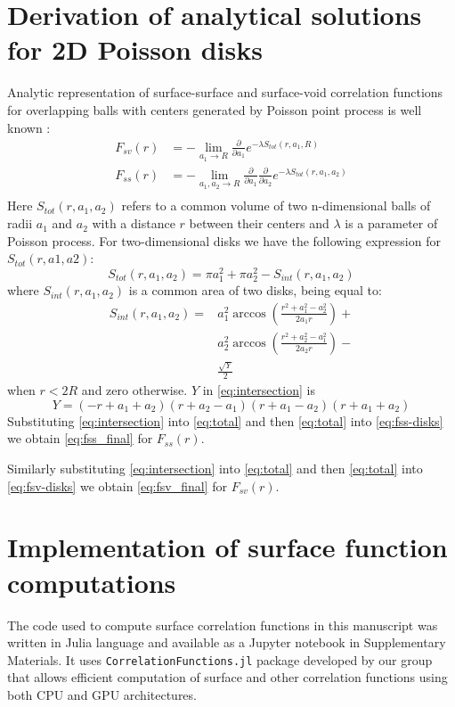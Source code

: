 \documentclass[reprint,amsmath,amssymb,aps,pre]{revtex4-1}
\newcommand{\code}[1]{\colorbox{light-gray}{\texttt{#1}}}
\begin{document}
\section{Derivation of analytical solutions for 2D Poisson disks}
\label{ap:overlapping-disks}
Analytic representation of surface-surface and surface-void correlation
functions for overlapping balls with centers generated by Poisson point process
is well known \cite{Torq_book}:
\begin{align}
  F_{sv}(r) &= -\lim_{a_1 \rightarrow R} \frac{\partial}{\partial a_1}
  e^{-\lambda S_{tot}(r, a_1, R)} \label{eq:fsv-disks} \\
  F_{ss}(r) &= -\lim_{a_1, a_2 \rightarrow R} \frac{\partial}{\partial a_1}
  \frac{\partial}{\partial a_2} e^{-\lambda S_{tot}(r, a_1,
    a_2)} \label{eq:fss-disks} \\
\end{align}
Here $S_{tot}(r, a_1, a_2)$ refers to a common volume of two n-dimensional balls
of radii $a_1$ and $a_2$ with a distance $r$ between their centers and $\lambda$
is a parameter of Poisson process. For two-dimensional disks we have the
following expression for $S_{tot}(r, a1, a2)$:
\begin{equation}
  S_{tot}(r, a_1, a_2) = \pi a_1^2 + \pi a_2^2 - S_{int}(r, a_1, a_2) \label{eq:total}
\end{equation}
where $S_{int}(r, a_1, a_2)$ is a common area of two disks, being equal to:
\cite{Math_stack_link}
\begin{align}
  S_{int}(r, a_1, a_2) =&  a_1^2 \arccos(\frac{r^2+a_1^2-a_2^2}{2a_1r}) + \\
  & a_2^2 \arccos(\frac{r^2+a_2^2-a_1^2}{2a_2r}) - \\
  & \frac{\sqrt{Y}}{2} \label{eq:intersection}
\end{align}
when $r<2R$ and zero otherwise. $Y$ in \cref{eq:intersection} is
\begin{equation*}
  Y = (-r+a_1+a_2)(r+a_2-a_1)(r+a_1-a_2)(r+a_1+a_2)
\end{equation*}
Substituting \cref{eq:intersection} into \cref{eq:total} and then
\cref{eq:total} into \cref{eq:fss-disks} we obtain \cref{eq:fss_final} for
$F_{ss}(r)$.

Similarly substituting \cref{eq:intersection} into \cref{eq:total} and then
\cref{eq:total} into \cref{eq:fsv-disks} we obtain \cref{eq:fsv_final} for
$F_{sv}(r)$.

\section{Implementation of surface function computations}
The code used to compute surface correlation functions in this manuscript was
written in Julia language and available as a Jupyter notebook in Supplementary
Materials. It uses \code{CorrelationFunctions.jl} package developed by our group
\cite{CorrFunc.jl_paper} that allows efficient computation of surface and other
correlation functions using both CPU and GPU architectures.
\end{document}

